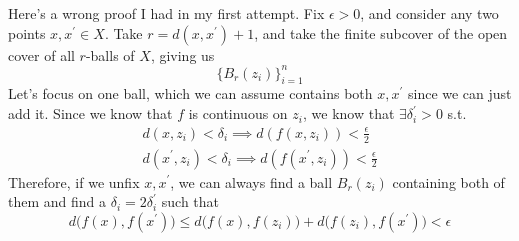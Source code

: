   \begin{example}
    \label{ex:wrong-proof-attempt-to-reflect-on-my-actions}
    Here's a wrong proof I had in my first attempt. Fix $\epsilon > 0$, and consider any two points $x, x^\prime \in X$. Take $r = d(x, x^\prime) + 1$, and take the finite subcover of the open cover of all $r$-balls of $X$, giving us 
    \begin{equation}
      \{B_r (z_i)\}_{i=1}^n 
    \end{equation}
    Let's focus on one ball, which we can assume contains both $x, x^\prime$ since we can just add it. Since we know that $f$ is continuous on $z_i$, we know that $\exists \delta_i^\prime > 0$ s.t. 
    \begin{align}
      d(x, z_i) < \delta_i \implies d(f(x, z_i)) < \frac{\epsilon}{2} \\
      d(x^\prime, z_i) < \delta_i \implies d(f(x^\prime, z_i)) < \frac{\epsilon}{2}
    \end{align}
    Therefore, if we unfix $x, x^\prime$, we can always find a ball $B_r (z_i)$ containing both of them and find a $\delta_i = 2 \delta_i^\prime$ such that 
    \begin{equation}
      d\big( f(x), f(x^\prime) \big) \leq d \big( f(x), f(z_i) \big) + d\big( f(z_i), f(x^\prime) \big) < \epsilon
    \end{equation}
  \end{example}

